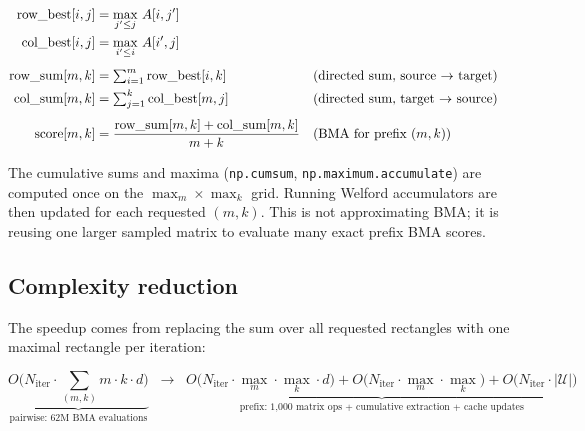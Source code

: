 \documentclass[11pt,a4paper]{article}
\begin{document}
\begin{align}
	\text{row\_best}[i, j]
	 & = \max_{j' \le j}\, A[i, j']
	\notag                                                                                                        \\
	\text{col\_best}[i, j]
	 & = \max_{i' \le i}\, A[i', j]
	\notag                                                                                                        \\[4pt]
	\text{row\_sum}[m, k]
	 & = \textstyle\sum_{i=1}^{m} \text{row\_best}[i, k]
	 &                                                               & \text{(directed sum, source $\to$ target)}
	\notag                                                                                                        \\
	\text{col\_sum}[m, k]
	 & = \textstyle\sum_{j=1}^{k} \text{col\_best}[m, j]
	 &                                                               & \text{(directed sum, target $\to$ source)}
	\notag                                                                                                        \\[4pt]
	\text{score}[m, k]
	 & = \frac{\text{row\_sum}[m, k] + \text{col\_sum}[m, k]}{m + k}
	 &                                                               & \text{(BMA for prefix $(m,k)$)}
\end{align}

The cumulative sums and maxima (\texttt{np.cumsum}, \texttt{np.maximum.accumulate})
are computed once on the $\max_m \times \max_k$ grid. Running Welford
accumulators are then updated for each requested $(m,k)$. This is not
approximating BMA; it is reusing one larger sampled matrix to evaluate many
exact prefix BMA scores.

\subsection{Complexity reduction}

The speedup comes from replacing the sum over all requested rectangles with
one maximal rectangle per iteration:

\[
	\underbrace{O\!\bigl(N_\text{iter} \cdot \textstyle\sum_{(m,k)} m \cdot k \cdot d\bigr)}_{\text{pairwise: 62M BMA evaluations}}
	\;\;\longrightarrow\;\;
	\underbrace{O\!\bigl(N_\text{iter} \cdot \max_m \cdot \max_k \cdot d\bigr)
		+ O\!\bigl(N_\text{iter} \cdot \max_m \cdot \max_k\bigr)
		+ O\!\bigl(N_\text{iter} \cdot |\mathcal{U}|\bigr)}_{\text{prefix: 1{,}000 matrix ops + cumulative extraction + cache updates}}
\]
\end{document}
